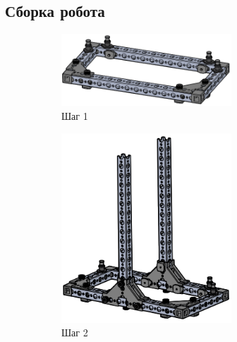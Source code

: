 \subsection{Сборка робота}
\begin{figure}[h!]
    \begin{subfigure}[b]{0.45\textwidth}
        \centering
        \includegraphics[width=0.7\textwidth]{fig/assembly/3.1.png}
        \caption*{Шаг 1}
    \end{subfigure}
    \begin{subfigure}[b]{0.45\textwidth}
        \centering
        \includegraphics[width=0.7\textwidth]{fig/assembly/3.2.png}
        \caption*{Шаг 2}
    \end{subfigure}
    \begin{subfigure}[b]{0.45\textwidth}
        \centering

\end{subfigure}
\end{figure}
